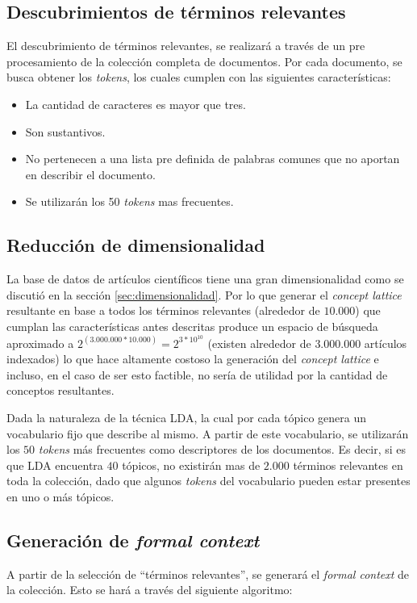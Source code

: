 \documentclass[12pt,oneside,letterpaper]{book}
\newcommand{\eng}[1]{\textit{#1}\xspace}			%
\newcommand{\abr}[1]{\textsc{#1}\xspace}           %
\theoremstyle{definition}
\begin{document}
\subsection{Descubrimientos de términos relevantes}
\label{sub:descubrimiento}
El descubrimiento de términos relevantes, se realizará a través de un pre procesamiento de la colección completa de documentos. Por cada documento, se busca obtener los \eng{tokens}, los cuales cumplen con las siguientes características:
\begin{itemize}
	\item La cantidad de caracteres es mayor que tres.
	\item Son sustantivos.
	\item No pertenecen a una lista pre definida de palabras comunes que no aportan en describir el documento.
	\item Se utilizarán los 50 \eng{tokens} mas frecuentes.
\end{itemize}


\subsection{Reducción de dimensionalidad}
\label{sub:reduccion_de_dimensionalidad}
La base de datos de artículos científicos tiene una gran dimensionalidad como se discutió en la sección \ref{sec:dimensionalidad}. Por lo que generar el \eng{concept lattice} resultante en base a todos los términos relevantes (alrededor de $10.000$) que cumplan las características antes descritas produce un espacio de búsqueda aproximado a $2^{(3.000.000*10.000)} = 2^{3*10^{10}}$ (existen alrededor de $3.000.000$ artículos indexados) lo que hace altamente costoso la generación del \eng{concept lattice} e incluso, en el caso de ser esto factible, no sería de utilidad por la cantidad de conceptos resultantes. 

Dada la naturaleza de la técnica \abr{LDA}, la cual por cada tópico genera un vocabulario fijo que describe al mismo. A partir de este vocabulario, se utilizarán los $50$ \emph{tokens} más frecuentes como descriptores de los documentos. Es decir, si es que \abr{LDA} encuentra $40$ tópicos, no existirán mas de $2.000$ términos relevantes en toda la colección, dado que algunos \eng{tokens} del vocabulario pueden estar presentes en uno o más tópicos.

\subsection{Generación de \eng{formal context}}
\label{sub:generacion}
A partir de la selección de ``términos relevantes'', se generará el \eng{formal context} de la colección. Esto se hará a través del siguiente algoritmo:
\end{document}
